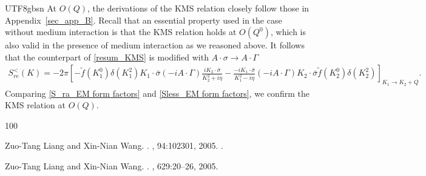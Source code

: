 \documentclass[11pt]{article}\def\baselinestretch{1.4}
\def\d{{\delta}}
\def\G{{\Gamma}}
\def\p{{\pi}}
\def\m{{\mu}}
\def\s{{\sigma}}
\newcommand{\pd}{{\partial}}
\begin{document}
\begin{CJK}{UTF8}{gbsn}
At $O(Q)$, the derivations of the KMS relation closely follow those in Appendix~\ref{sec_app_B}. Recall that an essential property used in the case without medium interaction is that the KMS relation holds at $O(Q^0)$, which is also valid in the presence of medium interaction as we reasoned above. It follows that the counterpart of \eqref{resum_KMS} is modified with $A\cdot\s\to A\cdot\G$
\begin{align}\label{Sless_EM form factors}
S^<_{re}(K)
=-2\p\left[-\tilde{f}(K_1^0)\d(K_1^2)K_1\cdot\bar{\s}(-iA\cdot \G )\frac{iK_2\cdot \bar{\sigma }}{K_2^2+i \eta }-\frac{-iK_1\cdot \bar{\sigma }}{K_1^2-i \eta }(-iA\cdot \G )K_2\cdot\bar{\s}\tilde{f}(K_2^0)\d(K_2^2)\right]_{K_1\to K_2+Q}.
\end{align}
Comparing \eqref{S_ra_EM form factors} and \eqref{Sless_EM form factors}, we confirm the KMS relation at $O(Q)$.









\begin{thebibliography}{100}

	 Zuo-Tang Liang and Xin-Nian Wang.
	.
	, 94:102301, 2005.
	.

	 Zuo-Tang Liang and Xin-Nian Wang.
	.
	, 629:20--26, 2005.


\end{thebibliography}
\end{CJK}
\end{document}
